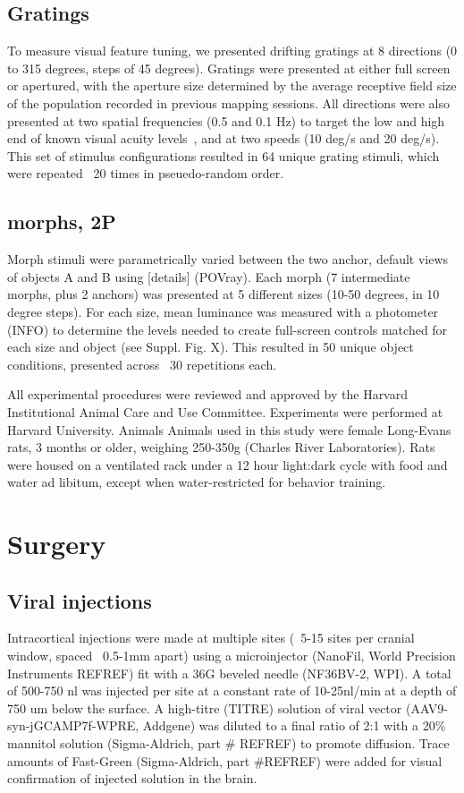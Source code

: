 \subsection{Gratings}
To measure visual feature tuning, we presented drifting gratings at 8 directions (0 to 315 degrees, steps of 45 degrees). Gratings were presented at either full screen or apertured, with the aperture size determined by the average receptive field size of the population recorded in previous  mapping sessions.  All directions were also presented at two spatial frequencies (0.5 and 0.1 Hz) to target the low and high end of known visual acuity levels~\cite{stuff}, and at two speeds (10 deg/s and 20 deg/s). This set of stimulus configurations resulted in 64 unique grating stimuli, which were repeated ~20 times in pseuedo-random order.


\subsection{morphs, 2P}
Morph stimuli were parametrically varied between the two anchor, default views of objects A and B using [details] (POVray). Each morph (7 intermediate morphs, plus 2 anchors) was presented at 5 different sizes (10-50 degrees, in 10 degree steps). For each size, mean luminance was measured with a photometer (INFO) to determine the levels needed to create full-screen controls matched for each size and object (see Suppl. Fig. X). This resulted in 50 unique object conditions, presented across ~30 repetitions each.


All experimental procedures were reviewed and approved by the Harvard Institutional Animal Care and Use Committee. Experiments were performed at Harvard University. 
Animals
Animals used in this study were female Long-Evans rats, 3 months or older, weighing 250-350g (Charles River Laboratories). Rats were housed on a ventilated rack under a 12 hour light:dark cycle with food and water ad libitum, except when water-restricted for behavior training. 

\section{Surgery}
\subsection{Viral injections}
Intracortical injections were made at multiple sites (~5-15 sites per cranial window, spaced ~0.5-1mm apart) using a microinjector (NanoFil, World Precision Instruments REFREF) fit with a 36G beveled needle (NF36BV-2, WPI). A total of 500-750 nl was injected per site at a constant rate of 10-25nl/min at a depth of 750 um below the surface. A high-titre (TITRE) solution of viral vector (AAV9-syn-jGCAMP7f-WPRE, Addgene) was diluted to a final ratio of 2:1 with a 20\% mannitol solution (Sigma-Aldrich, part # REFREF) to promote diffusion. Trace amounts of Fast-Green (Sigma-Aldrich, part #REFREF) were added for visual confirmation of injected solution in the brain.

